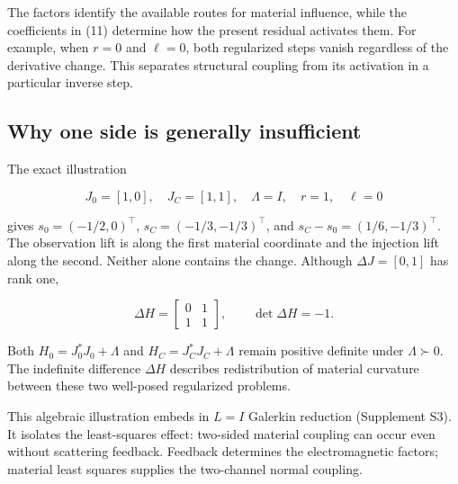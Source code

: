 The factors identify the available routes for material influence, while the coefficients in (11) determine how the present residual activates them. For example, when $r=0$ and $\ell=0$, both regularized steps vanish regardless of the derivative change. This separates structural coupling from its activation in a particular inverse step.

\subsection{Why one side is generally insufficient}

The exact illustration

\[
J_0=[1,0],\quad J_C=[1,1],\quad \Lambda=I,\quad r=1,\quad\ell=0
\]

gives \(s_0=(-1/2,0)^\top\), \(s_C=(-1/3,-1/3)^\top\), and \(s_C-s_0=(1/6,-1/3)^\top\). The observation lift is along the first material coordinate and the injection lift along the second. Neither alone contains the change. Although \(\Delta J=[0,1]\) has rank one,

\[
\Delta H=\begin{bmatrix}0&1\\1&1\end{bmatrix},\qquad\det\Delta H=-1. \tag{12}
\]

Both \(H_0=J_0^*J_0+\Lambda\) and \(H_C=J_C^*J_C+\Lambda\) remain positive definite under \(\Lambda\succ0\). The indefinite difference \(\Delta H\) describes redistribution of material curvature between these two well-posed regularized problems.

This algebraic illustration embeds in \(L=I\) Galerkin reduction (Supplement S3). It isolates the least-squares effect: two-sided material coupling can occur even without scattering feedback. Feedback determines the electromagnetic factors; material least squares supplies the two-channel normal coupling.
